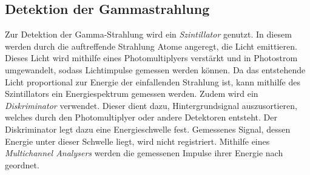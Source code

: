 \subsection{Detektion der Gammastrahlung}

    Zur Detektion der Gamma-Strahlung wird ein \textit{Szintillator} genutzt.
    In diesem werden durch die auftreffende Strahlung Atome angeregt,
    die Licht emittieren.
    Dieses Licht wird mithilfe eines Photomultiplyers verstärkt und in Photostrom umgewandelt,
    sodass Lichtimpulse gemessen werden können.
    Da das entstehende Licht proportional zur Energie der einfallenden Strahlung ist,
    kann mithilfe des Szintillators ein Energiespektrum gemessen werden.
    Zudem wird ein \textit{Diskriminator} verwendet.
    Dieser dient dazu,
    Hintergrundsignal auszusortieren,
    welches durch den Photomultiplyer oder andere Detektoren entsteht.
    Der Diskriminator legt dazu eine Energieschwelle fest.
    Gemessenes Signal,
    dessen Energie unter dieser Schwelle liegt,
    wird nicht registriert.
    Mithilfe eines \textit{Multichannel Analysers} werden die gemessenen Impulse ihrer Energie nach geordnet.
